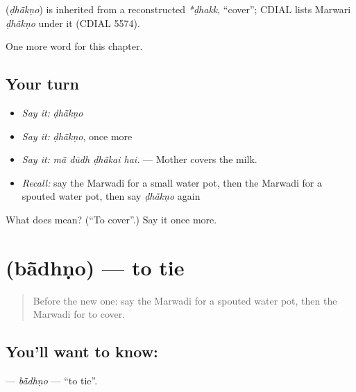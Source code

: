 \begin{cousinweb}
\textbf{} (\emph{ḍhā̃kṇo}) is inherited from a reconstructed \emph{*ḍhakk}, \textquotedblleft{}cover\textquotedblright{}; CDIAL lists Marwari \emph{ḍhā̃kṇo} under it (CDIAL 5574).
\end{cousinweb}

\begin{grammarlens}[title={What you've built}]
One more word for this chapter.
\end{grammarlens}

\subsection*{Your turn}
\begin{itemize}
\raggedright
  \item \emph{Say it:} \emph{ḍhā̃kṇo}
  \item \emph{Say it:} \emph{ḍhā̃kṇo}, once more
  \item \emph{Say it:} \emph{mā̃ dūdh ḍhā̃kai hai.} — Mother covers the milk.
  \item \emph{Recall:} say the Marwadi for a small water pot, then the Marwadi for a spouted water pot, then say \emph{ḍhā̃kṇo} again
\end{itemize}

\begin{tcolorbox}[breakable,colback=teal!4,colframe=teal!35!black,title={Before you move on}]
What does  mean? (\textquotedblleft{}To cover\textquotedblright{}.) Say it once more.
\end{tcolorbox}
\section[\texorpdfstring{\mw{बांधणो} (bā̃dhṇo)}{बांधणो (bā̃dhṇo)}]{ (bā̃dhṇo) — to tie}

\label{lesson:MW-C176-badhno}



\begin{quote}
Before the new one: say the Marwadi for a spouted water pot, then the Marwadi for to cover.
\end{quote}

\subsection*{You'll want to know: }
\textbf{} — \emph{bā̃dhṇo} — \textquotedblleft{}to tie\textquotedblright{}.

